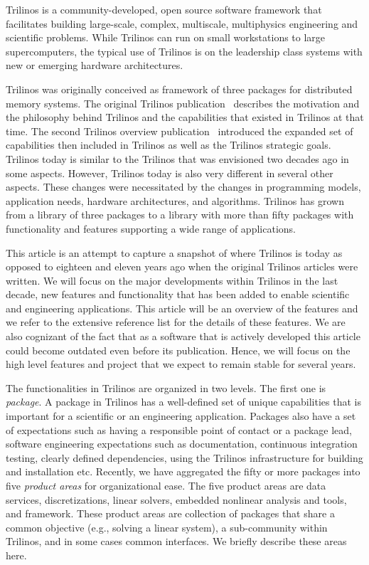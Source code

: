 

Trilinos is a community-developed, open source software framework that facilitates building large-scale, complex, multiscale, multiphysics engineering and scientific problems. While Trilinos can run on small workstations to large supercomputers, the typical use of Trilinos is on the leadership class systems with new or emerging hardware architectures.

Trilinos was originally conceived as framework of three packages for distributed memory systems. The original Trilinos publication~\cite{Heroux2005a} describes the motivation and the philosophy behind Trilinos and the capabilities that existed in Trilinos at that time. The second Trilinos overview publication~\cite{Heroux2012} introduced the expanded set of capabilities then included in Trilinos as well as the Trilinos strategic goals. Trilinos today is similar to the Trilinos that was envisioned two decades ago in some aspects. However, Trilinos today is also very different in several other aspects. These changes were necessitated by the changes in programming models, application needs, hardware architectures, and algorithms. Trilinos has grown from a library of three packages to a library with more than fifty packages with functionality and features supporting a wide range of applications.

This article is an attempt to capture a snapshot of where Trilinos is today as opposed to eighteen and eleven years ago when the original Trilinos articles were written. We will focus on the major developments within Trilinos in the last decade, new features and functionality that has been added to enable scientific and engineering applications. This article will be an overview of the features and we refer to the extensive reference list for the details of these features. We are also cognizant of the fact that as a software that is actively developed this article could become outdated even before its publication. Hence, we will focus on the high level features and project that we expect to remain stable for several years.

The functionalities in Trilinos are organized in two levels. The first one is \textit{package}. A package in Trilinos has a well-defined set of unique capabilities that is important for a scientific or an engineering application. Packages also have a set of expectations such as having a responsible point of contact or a package lead, software engineering expectations such as documentation, continuous integration testing, clearly defined dependencies, using the Trilinos infrastructure for building and installation etc. Recently, we have aggregated the fifty or more packages into five \textit{product areas} for organizational ease. The five product areas are data services, discretizations, linear solvers, embedded nonlinear analysis and tools, and framework. These product areas are collection of packages that share a common objective (e.g., solving a linear system), a sub-community within Trilinos, and in some cases common interfaces. We briefly describe these areas here.

